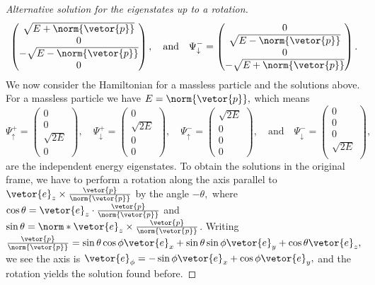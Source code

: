 \begin{proof}[Alternative solution for the eigenstates up to a rotation]
\begin{equation*}
\begin{pmatrix}
         \sqrt{E + \norm{\vetor{p}}}\\
         0\\
         -\sqrt{E - \norm{\vetor{p}}}\\
         0
      \end{pmatrix},\quad\text{and}\quad
      \Psi^-_\downarrow = \begin{pmatrix}
         0\\
         \sqrt{E - \norm{\vetor{p}}}\\
         0\\
         -\sqrt{E + \norm{\vetor{p}}}
      \end{pmatrix}.
   \end{equation*}
   We now consider the Hamiltonian for a massless particle and the solutions above. For a massless particle we have \(E = \norm{\vetor{p}},\) which means
   \begin{equation*}
      \Psi^+_\uparrow = \begin{pmatrix}
         0\\
         0\\
         \sqrt{2E}\\
         0
      \end{pmatrix},\quad
      \Psi^+_\downarrow = \begin{pmatrix}
         0\\
         \sqrt{2E}\\
         0\\
         0
      \end{pmatrix},\quad
      \Psi^-_\uparrow = \begin{pmatrix}
         \sqrt{2E}\\
         0\\
         0\\
         0
      \end{pmatrix},\quad\text{and}\quad
      \Psi^-_\downarrow = \begin{pmatrix}
         0\\
         0\\
         0\\
         \sqrt{2E}\\
      \end{pmatrix},
   \end{equation*}
   are the independent energy eigenstates. To obtain the solutions in the original frame, we have to perform a rotation along the axis parallel to \(\vetor{e}_z \times \frac{\vetor{p}}{\norm{\vetor{p}}}\) by the angle \(-\theta,\) where \(\cos\theta = \vetor{e}_z \cdot \frac{\vetor{p}}{\norm{\vetor{p}}}\) and \(\sin\theta = \norm*{\vetor{e}_z \times \frac{\vetor{p}}{\norm{\vetor{p}}}}\). Writing \(\frac{\vetor{p}}{\norm{\vetor{p}}} = \sin\theta \cos\phi \vetor{e}_x + \sin\theta \sin\phi \vetor{e}_y + \cos\theta \vetor{e}_z,\) we see the axis is \(\vetor{e}_\phi = -\sin\phi \vetor{e}_x + \cos\phi \vetor{e}_y,\) and the rotation yields the solution found before.
\end{proof}

